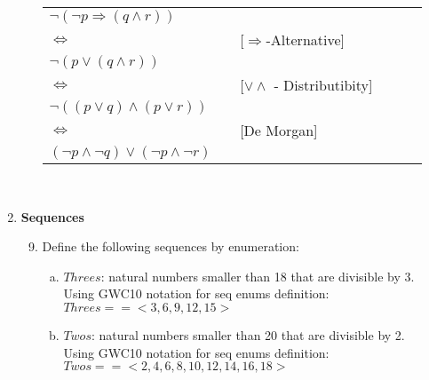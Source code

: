 \documentclass{article}
\renewcommand{\implies}{\Rightarrow}
\renewcommand{\iff}{\Leftrightarrow}
\begin{document}
\begin{enumerate}[\bf I.]
\begin{enumerate}[1.]
  \begin{tabular}{l ll lll}  
  $ \neg(\neg p \implies (q\land r))$  &  &  \\
  $\iff$  & & [$\implies$-Alternative] \\
  $ \neg(p \lor (q \land r)) $& & \\
  $\iff$ & & [$\lor \land$ - Distributibity] \\
  $ \neg((p \lor q) \land (p \lor r))$ & & \\
  $\iff$ & &  [De Morgan] \\
  $(\neg p\land \neg q)\lor(\neg p\land\neg r)$ & & \\
  
\end{tabular} \\
\end{enumerate}

\item \textbf{Sequences}


\begin{enumerate}[1.]\setcounter{enumii}{8}

\item Define the following sequences by enumeration:
\begin{enumerate}[a.]
\item $Threes$: natural numbers smaller than 18 that are divisible by 3. \\
  Using GWC10 notation for seq enums definition: \\
  $Threes== <3 , 6 ,  9 , 12 , 15>$ \\
\item  $Twos$: natural numbers smaller than 20 that are divisible by 2. \\
  Using GWC10 notation for seq enums definition: \\
  $Twos== <2 , 4 , 6 , 8 , 10 , 12 , 14 , 16 , 18>$ \\
\end{enumerate}


\end{enumerate}
\end{enumerate}
\end{document}
